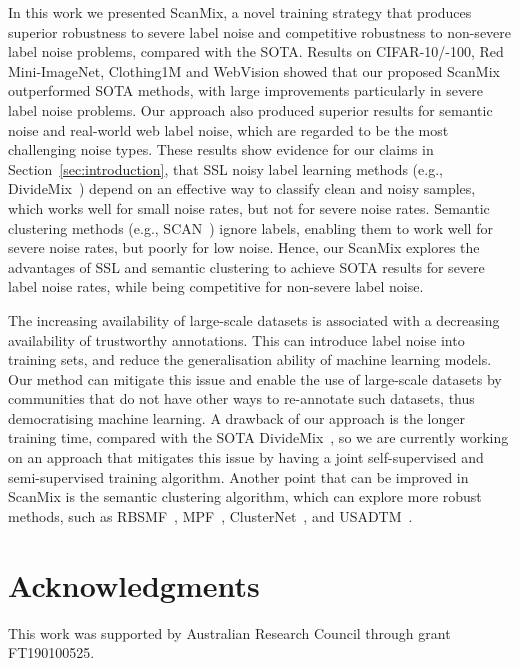\documentclass[review]{elsarticle}
\theoremstyle{plain}
\begin{document}
In this work we presented ScanMix, a novel training strategy that produces superior robustness to severe label noise and competitive robustness to non-severe label noise problems, compared with the SOTA.
Results on CIFAR-10/-100, Red  Mini-ImageNet, Clothing1M and WebVision showed that our proposed ScanMix outperformed SOTA methods, with large improvements particularly in severe label noise problems.
Our approach also produced superior results for semantic noise and real-world web label noise, which are regarded to be the most challenging noise types. 
These results show evidence for our claims in Section~\ref{sec:introduction}, that SSL noisy label learning methods (e.g., DivideMix~\citep{li2020dividemix}) depend on an effective way to classify clean and noisy samples, which works well for small noise rates, but not for severe noise rates.  Semantic clustering methods (e.g., SCAN~\citep{SCAN}) ignore labels, enabling them to work well for severe noise rates, but poorly for low noise.  
Hence, our ScanMix explores the advantages of SSL and semantic clustering to achieve SOTA results for severe label noise rates, while being competitive for non-severe label noise.

The increasing availability of large-scale datasets is associated with a decreasing availability of trustworthy annotations. This can introduce label noise into training sets, and reduce the generalisation ability of machine learning models.
Our method can mitigate this issue and enable the use of large-scale datasets by communities that do not have other ways to re-annotate such datasets, thus democratising machine learning.
A drawback of our approach is the longer training time, compared with the SOTA DivideMix~\citep{li2020dividemix}, so we are currently working on an approach that mitigates this issue by having a joint self-supervised and semi-supervised training algorithm.
Another point that can be improved in ScanMix is the semantic clustering algorithm, which can explore more robust methods, such as RBSMF~\citep{wang2020robust}, MPF~\citep{wang2018detecting}, ClusterNet~\citep{shukla2020semi}, and USADTM~\citep{han2020unsupervised}.


\section*{Acknowledgments}

This work was supported by Australian Research Council through grant FT190100525.  
\end{document}
